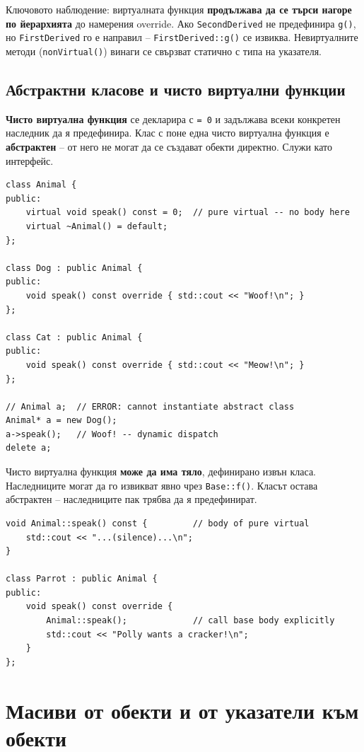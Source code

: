 \documentclass{scrartcl}
\begin{document}
\begin{FlushLeft}
Ключовото наблюдение: виртуалната функция \textbf{продължава да се търси нагоре по йерархията} до намерения override. Ако \texttt{SecondDerived} не предефинира \texttt{g()}, но \texttt{FirstDerived} го е направил -- \texttt{FirstDerived::g()} се извиква. Невиртуалните методи (\texttt{nonVirtual()}) винаги се свързват статично с типа на указателя.

\subsection{Абстрактни класове и чисто виртуални функции}

\textbf{Чисто виртуална функция} се декларира с \texttt{= 0} и задължава всеки конкретен наследник да я предефинира. Клас с поне една чисто виртуална функция е \textbf{абстрактен} -- от него не могат да се създават обекти директно. Служи като интерфейс.

\begin{lstlisting}
class Animal {
public:
    virtual void speak() const = 0;  // pure virtual -- no body here
    virtual ~Animal() = default;
};

class Dog : public Animal {
public:
    void speak() const override { std::cout << "Woof!\n"; }
};

class Cat : public Animal {
public:
    void speak() const override { std::cout << "Meow!\n"; }
};

// Animal a;  // ERROR: cannot instantiate abstract class
Animal* a = new Dog();
a->speak();   // Woof! -- dynamic dispatch
delete a;
\end{lstlisting}

Чисто виртуална функция \textbf{може да има тяло}, дефинирано извън класа. Наследниците могат да го извикват явно чрез \texttt{Base::f()}. Класът остава абстрактен -- наследниците пак трябва да я предефинират.

\begin{lstlisting}
void Animal::speak() const {         // body of pure virtual
    std::cout << "...(silence)...\n";
}

class Parrot : public Animal {
public:
    void speak() const override {
        Animal::speak();             // call base body explicitly
        std::cout << "Polly wants a cracker!\n";
    }
};
\end{lstlisting}

\section{Масиви от обекти и от указатели към обекти}


\end{FlushLeft}
\end{document}
